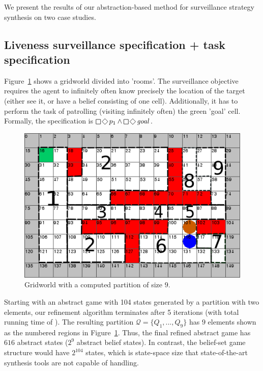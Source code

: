 We present the results of our abstraction-based method for surveillance strategy synthesis on two case studies. 

\subsection{Liveness surveillance specification + task specification}
Figure~\ref{fig:case1} shows a gridworld divided into  'rooms'. The surveillance objective requires the agent to infinitely often know precisely the location of the target (either see it, or have a belief consisting of one cell). Additionally, it has to perform the task of patrolling (visiting infinitely often) the green 'goal' cell. Formally, the specification is $\LTLglobally\LTLfinally p_1 \wedge \LTLglobally\LTLfinally \mathit{goal}$. 


\begin{figure}
\centering
\includegraphics[scale=0.4]{text970.png}\caption{Gridworld with a computed partition of size $9$.}\label{fig:case1}
\vspace{-.5cm}
\end{figure}


Starting with an abstract game with 104 states generated by a partition with two elements, our refinement algorithm terminates after 5 iterations (with total running time of ). The resulting partition $\mathcal{Q} = \{Q_1,...,Q_9 \}$ has $9$ elements shown as the numbered regions in Figure~\ref{fig:case1}. Thus, the final refined abstract game has $616$ abstract states ($2^9$ abstract belief states). In contrast, the belief-set game structure would have $2^{104}$ states, which is state-space size that state-of-the-art synthesis tools are not capable of handling.


